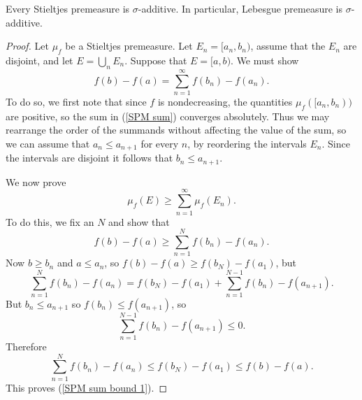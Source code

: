 \begin{theorem}
Every Stieltjes premeasure is $\sigma$-additive.
In particular, Lebesgue premeasure is $\sigma$-additive.
\end{theorem}
\begin{proof}
Let $\mu_{f}$ be a Stieltjes premeasure.
Let $E_{n} = [a_{n}, b_{n})$, assume that the $E_{n}$ are disjoint, and let $E = \bigcup_{n} E_{n}$.
Suppose that $E = [a, b)$. We must show
\begin{equation}\label{SPM sum}
f(b) - f(a) = \sum_{n=1}^{\infty} f(b_{n}) - f(a_{n}).
\end{equation}
To do so, we first note that since $f$ is nondecreasing, the quantities $\mu_{f}([a_{n}, b_{n}))$ are positive, so the sum in (\ref{SPM sum}) converges absolutely.
Thus we may rearrange the order of the summands without affecting the value of the sum, so we can assume that $a_{n} \leq a_{n+1}$ for every $n$, by reordering the intervals $E_{n}$.
Since the intervals are disjoint it follows that $b_{n} \leq a_{n+1}$.

We now prove
\[\mu_{f}(E) \geq \sum_{n=1}^{\infty} \mu_{f}(E_{n}).\]
To do this, we fix an $N$ and show that
\begin{equation}\label{SPM sum bound 1}
f(b) - f(a) \geq \sum_{n=1}^{N} f(b_{n}) - f(a_{n}).
\end{equation}
Now $b \geq b_{n}$ and $a \leq a_{n}$, so $f(b) - f(a) \geq f(b_{N}) - f(a_{1})$, but
\[\sum_{n=1}^{N} f(b_{n}) - f(a_{n}) = f(b_{N}) - f(a_{1}) + \sum_{n=1}^{N-1} f(b_{n}) - f(a_{n+1}).\]
But $b_{n} \leq a_{n+1}$ so $f(b_{n}) \leq f(a_{n+1})$, so
\[\sum_{n=1}^{N-1} f(b_{n}) - f(a_{n+1}) \leq 0.\]
Therefore
\[\sum_{n=1}^{N} f(b_{n}) - f(a_{n}) \leq f(b_{N}) - f(a_{1}) \leq f(b) - f(a).\]
This proves (\ref{SPM sum bound 1}).


\end{proof}
